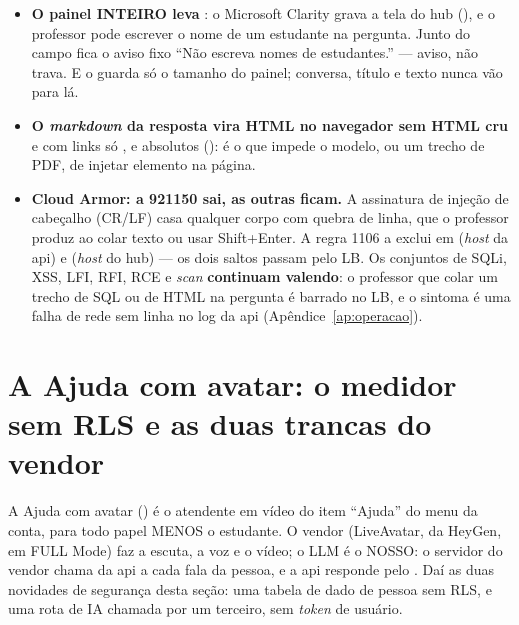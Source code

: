 \begin{itemize}
  \item \textbf{O painel INTEIRO leva }: o Microsoft
    Clarity grava a tela do hub (), e o professor pode escrever o
    nome de um estudante na pergunta. Junto do campo fica o aviso fixo
    \enquote{Não escreva nomes de estudantes.} --- aviso, não trava. E o
     guarda só o tamanho do painel; conversa, título e texto
    nunca vão para lá.
  \item \textbf{O \emph{markdown} da resposta vira HTML no navegador sem HTML
    cru} e com links só ,  e  absolutos
    (): é o que impede o
    modelo, ou um trecho de PDF, de injetar elemento na página.
  \item \textbf{Cloud Armor: a 921150 sai, as outras ficam.} A assinatura de
    injeção de cabeçalho (CR/LF) casa qualquer corpo com quebra de linha, que o
    professor produz ao colar texto ou usar Shift+Enter. A regra 1106 a exclui em
     (\emph{host} da api) e
     (\emph{host} do hub) --- os dois saltos
    passam pelo LB. Os conjuntos de SQLi, XSS, LFI, RFI, RCE e \emph{scan}
    \textbf{continuam valendo}: o professor que colar um trecho de SQL ou de HTML
    na pergunta é barrado no LB, e o sintoma é uma falha de rede sem linha no log
    da api (Apêndice~\ref{ap:operacao}).
\end{itemize}

\section{A Ajuda com avatar: o medidor sem RLS e as duas trancas do vendor}
\label{sec:ajuda-seguranca}

A Ajuda com avatar () é o atendente em vídeo do item
\enquote{Ajuda} do menu da conta, para todo papel MENOS o estudante. O vendor
(LiveAvatar, da HeyGen, em FULL Mode) faz a escuta, a voz e o vídeo; o LLM é o
NOSSO: o servidor do vendor chama  da api
a cada fala da pessoa, e a api responde pelo . Daí as duas
novidades de segurança desta seção: uma tabela de dado de pessoa sem RLS, e uma
rota de IA chamada por um terceiro, sem \emph{token} de usuário.

